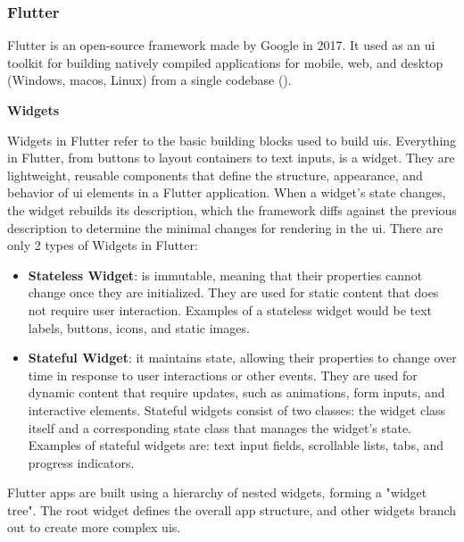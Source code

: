 \begin{multicols}{2}


      \subsubsection{Flutter}
      Flutter is an open-source framework made by Google in 2017. It used as an \acrshort{ui} toolkit for building
      natively compiled applications for mobile, web, and desktop (Windows, mac\acrshort{os}, Linux) from a single
      codebase (\textit{\cite{flutter}}).

      \textbf{Widgets}

      Widgets in Flutter refer to the basic building blocks used to build \acrshort{ui}s. Everything in Flutter, from
      buttons to layout containers to text inputs, is a widget. They are lightweight, reusable components that
      define the structure, appearance, and behavior of \acrshort{ui} elements in a Flutter application. When a widget's
      state changes, the widget rebuilds its description, which the framework diffs against the previous description
      to determine the minimal changes for rendering in the \acrshort{ui}. There are only 2 types of Widgets
      in Flutter:
      \begin{itemize}
            \item \textbf{Stateless Widget}: is immutable, meaning that their properties cannot change once they are
                  initialized. They are used for static content that does not require user interaction. Examples of a
                  stateless widget would be text labels, buttons, icons, and static images.
            \item \textbf{Stateful Widget}: it maintains state, allowing their properties to change over time in response
                  to user interactions or other events. They are used for dynamic content that require updates, such as
                  animations, form inputs, and interactive elements. Stateful widgets consist of two classes: the widget
                  class itself and a corresponding state class that manages the widget's state. Examples of stateful widgets
                  are: text input fields, scrollable lists, tabs, and progress indicators.
      \end{itemize}
      Flutter apps are built using a hierarchy of nested widgets, forming a "widget tree". The root widget defines the
      overall app structure, and other widgets branch out to create more complex \acrshort{ui}s.
\end{multicols}


